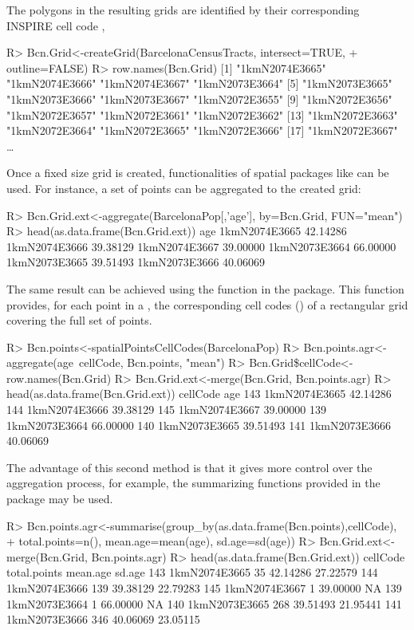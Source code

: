 The polygons in the resulting grids are identified by their corresponding INSPIRE cell code \citep{INSPIRE2010},
%
\begin{example*}
R> Bcn.Grid<-createGrid(BarcelonaCensusTracts, intersect=TRUE, 
 + outline=FALSE)
R> row.names(Bcn.Grid)
  [1] "1kmN2074E3665" "1kmN2074E3666" "1kmN2074E3667" "1kmN2073E3664"
  [5] "1kmN2073E3665" "1kmN2073E3666" "1kmN2073E3667" "1kmN2072E3655"
  [9] "1kmN2072E3656" "1kmN2072E3657" "1kmN2072E3661" "1kmN2072E3662"
 [13] "1kmN2072E3663" "1kmN2072E3664" "1kmN2072E3665" "1kmN2072E3666"
 [17] "1kmN2072E3667" …
\end{example*}
%

Once a fixed size grid is created, functionalities of spatial packages like  can be used. For instance, a set of points can be aggregated to the created grid: 
%
\begin{example*}
R> Bcn.Grid.ext<-aggregate(BarcelonaPop[,'age'], by=Bcn.Grid, FUN="mean")
R> head(as.data.frame(Bcn.Grid.ext))
                   age
1kmN2074E3665 42.14286
1kmN2074E3666 39.38129
1kmN2074E3667 39.00000
1kmN2073E3664 66.00000
1kmN2073E3665 39.51493
1kmN2073E3666 40.06069
\end{example*}
%
The same result can be achieved using the  function in the  package. This function provides, for each point in a , the corresponding cell codes () of a rectangular grid covering the full set of points.
%
\begin{example*}
R> Bcn.points<-spatialPointsCellCodes(BarcelonaPop)
R> Bcn.points.agr<-aggregate(age~cellCode, Bcn.points, "mean")
R> Bcn.Grid\$cellCode<-row.names(Bcn.Grid)
R> Bcn.Grid.ext<-merge(Bcn.Grid, Bcn.points.agr)
R> head(as.data.frame(Bcn.Grid.ext))
         cellCode      age
143 1kmN2074E3665 42.14286
144 1kmN2074E3666 39.38129
145 1kmN2074E3667 39.00000
139 1kmN2073E3664 66.00000
140 1kmN2073E3665 39.51493
141 1kmN2073E3666 40.06069
\end{example*}
%
The advantage of this second method is that it gives more control over the aggregation process, for example, the summarizing functions provided in the  package may be used.
%
\begin{example*}
R> Bcn.points.agr<-summarise(group_by(as.data.frame(Bcn.points),cellCode),
 +	 total.points=n(), mean.age=mean(age), sd.age=sd(age))
R> Bcn.Grid.ext<-merge(Bcn.Grid, Bcn.points.agr)
R> head(as.data.frame(Bcn.Grid.ext))
         cellCode total.points mean.age   sd.age
143 1kmN2074E3665           35 42.14286 27.22579
144 1kmN2074E3666          139 39.38129 22.79283
145 1kmN2074E3667            1 39.00000       NA
139 1kmN2073E3664            1 66.00000       NA
140 1kmN2073E3665          268 39.51493 21.95441
141 1kmN2073E3666          346 40.06069 23.05115
\end{example*}
%


